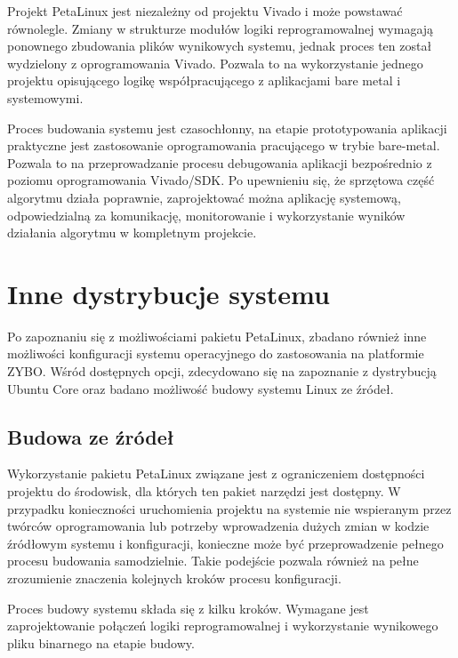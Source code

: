Projekt PetaLinux jest niezależny od projektu Vivado i może powstawać równolegle. 
Zmiany w strukturze modułów logiki reprogramowalnej wymagają ponownego zbudowania plików wynikowych systemu, jednak proces ten został wydzielony z oprogramowania Vivado. %
Pozwala to na wykorzystanie jednego projektu opisującego logikę współpracującego z aplikacjami bare metal i systemowymi. 

Proces budowania systemu jest czasochłonny, na etapie prototypowania aplikacji praktyczne jest zastosowanie oprogramowania pracującego w trybie bare-metal. %
Pozwala to na przeprowadzanie procesu debugowania aplikacji bezpośrednio z poziomu oprogramowania Vivado/SDK. 
Po upewnieniu się, że sprzętowa część algorytmu działa poprawnie, zaprojektować można aplikację systemową, odpowiedzialną za komunikację, monitorowanie i wykorzystanie wyników działania algorytmu w kompletnym projekcie.

\section{Inne dystrybucje systemu}
Po zapoznaniu się z możliwościami pakietu PetaLinux, zbadano również inne możliwości konfiguracji systemu operacyjnego do zastosowania na platformie ZYBO. 
Wśród dostępnych opcji, zdecydowano się na zapoznanie z dystrybucją Ubuntu Core oraz badano możliwość budowy systemu Linux ze źródeł.

\subsection{Budowa ze źródeł}
Wykorzystanie pakietu PetaLinux związane jest z ograniczeniem dostępności projektu do środowisk, dla których ten pakiet narzędzi jest dostępny. 
W przypadku konieczności uruchomienia projektu na systemie nie wspieranym przez twórców oprogramowania lub potrzeby wprowadzenia dużych zmian w kodzie źródłowym systemu i konfiguracji, konieczne może być przeprowadzenie pełnego procesu budowania samodzielnie. 
Takie podejście pozwala również na pełne zrozumienie znaczenia kolejnych kroków procesu konfiguracji.

Proces budowy systemu składa się z kilku kroków. 
Wymagane jest zaprojektowanie połączeń logiki reprogramowalnej i wykorzystanie wynikowego pliku binarnego na etapie budowy. %


